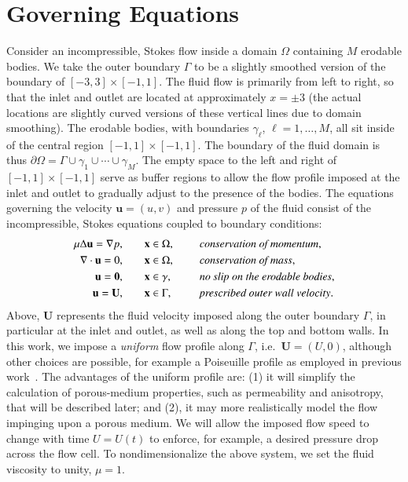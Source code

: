 \documentclass[3p]{elsarticle}
\newcommand{\bd}{{\partial}}
\newcommand{\grad}{{\nabla}}
\newcommand{\uu}{{\mathbf{u}}}
\newcommand{\UU}{{\mathbf{U}}}
\newcommand{\xx}{{\mathbf{x}}}
\def\gap{\hspace*{.2in}}
\begin{document}
\section{Governing Equations}
\label{sec:formulation}

Consider an incompressible, Stokes flow inside a domain $\Omega$ containing $M$ erodable bodies. We take the outer boundary $\Gamma$ to be a slightly smoothed version of the boundary of $[-3,3] \times [-1,1]$. The fluid flow is primarily from left to right, so that the inlet and outlet are located at approximately $x=\pm 3$ (the actual locations are slightly curved versions of these vertical lines due to domain smoothing). The erodable bodies, with boundaries $\gamma_\ell$, $\ell = 1,\ldots,M$, all sit inside of the central region $[-1,1] \times [-1,1]$. The boundary of the fluid domain is thus $\bd \Omega = \Gamma \cup \gamma_1 \cup \cdots \cup \gamma_M$. The empty space to the left and right of $[-1,1] \times [-1,1]$ serve as buffer regions to allow the flow profile imposed at the inlet and outlet to gradually adjust to the presence of the bodies. The equations governing the velocity $\uu = (u,v)$ and pressure $p$ of the fluid consist of the incompressible, Stokes equations coupled to boundary conditions: \begin{equation}
\label{eqn:StokesEq}
  \begin{split}
    \mu \Delta \uu = \grad p, &\hspace{20pt} \xx \in \Omega, \gap 
      &&\mbox{\em conservation of momentum}, \\
    \grad \cdot \uu = 0, &\hspace{20pt} \xx \in \Omega, \gap 
      &&\mbox{\em conservation of mass}, \\
    \uu = \mathbf{0}, &\hspace{20pt} \xx \in \gamma, \gap 
      &&\mbox{\em no slip on the erodable bodies}, \\
    \uu = \UU, &\hspace{20pt} \xx \in \Gamma, \gap 
      &&\mbox{\em prescribed outer wall velocity}.
  \end{split}
\end{equation}
Above, $\UU$ represents the fluid velocity imposed along the outer boundary $\Gamma$, in particular at the inlet and outlet, as well as along the top and bottom walls. In this work, we impose a {\em uniform} flow profile along $\Gamma$, i.e.~$\UU = (U,0)$, although other choices are possible, for example a Poiseuille profile as employed in previous work~\cite{chiu2020viscous, quaife2018boundary}. The advantages of the uniform profile are: (1) it will simplify the calculation of porous-medium properties, such as permeability and anisotropy, that will be described later; and (2), it may more realistically model the flow impinging upon a porous medium. We will allow the imposed flow speed to change with time $U = U(t)$ to enforce, for example, a desired pressure drop across the flow cell. To nondimensionalize the above system, we set the fluid viscosity to unity, $\mu = 1$.
\end{document}
